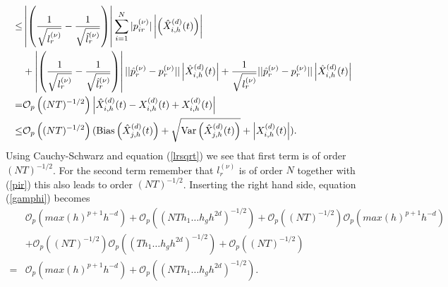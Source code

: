 \begin{equation}
\begin{split}
\leq & \left| \left( \frac{1}{\sqrt{l_r^{(\nu)}}} - \frac{1}{\sqrt{\hat{l}_r^{(\nu)}}} \right)\right| \sum_{i=1}^N  | p^{(\nu)}_{ir}| \left|  \left( \hat{X}^{(d)}_{i,h}(t)  \right)\right|\\
&+ \left| \left( \frac{1}{\sqrt{l_r^{(\nu)}}} - \frac{1}{\sqrt{\hat{l}_r^{(\nu)}}} \right) \right| ||   \hat{p}^{(\nu)}_{r} -p^{(\nu)}_{r}  || \left| \hat{X}^{(d)}_{i,h}(t) \right| +  \frac{1}{\sqrt{l_r^{(\nu)}}}  || \hat{p}^{(\nu)}_{r} - p^{(\nu)}_{r} ||  \left| \hat{X}^{(d)}_{i,h}(t)  \right| \\
=& \mathcal{O}_p\left( (N T)^{-1/2}\right) \left| \hat{X}^{(d)}_{i,h}(t) - X^{(d)}_{i,h}(t) +X^{(d)}_{i,h}(t) \right| \\
\leq & \mathcal{O}_p\left( (N T)^{-1/2}\right)(\operatorname{Bias}\left(\hat{X}^{(d)}_{j,h}(t)\right)+\sqrt{\operatorname{Var}\left(\hat{X}^{(d)}_{j,h}(t)\right)}+\left|X^{(d)}_{i,h}(t)\right| ).
\end{split}
\end{equation}
Using Cauchy-Schwarz and equation (\ref{lrsqrt}) we see that first term is of order $(NT)^{-1/2}$. For the second term remember that $l_r^{(\nu)}$ is of order $N$ together with  (\ref{pir}) this also leads to order $(NT)^{-1/2}$.
Inserting the right hand side, equation (\ref{gamphi}) becomes
\begin{equation}
\begin{split}
&\mathcal{O}_p\left( max(h)^{p+1} h^{-d}\right) +\mathcal{O}_p\left( (N T  h_1\dots h_g  h^{2d} )^{-1/2} \right)+\mathcal{O}_p\left(  (N T)^{-1/2}\right) \mathcal{O}_p\left( max(h)^{p+1} h^{-d}\right)\\
& + \mathcal{O}_p\left(  (N T)^{-1/2}\right)\mathcal{O}_p\left((T h_1\dots h_g  h^{2d})^{-1/2}  \right)+\mathcal{O}_p\left(  (N T)^{-1/2}\right)\\
=&\mathcal{O}_p\left( max(h)^{p+1} h^{-d}\right) +\mathcal{O}_p\left((N T  h_1\dots h_g  h^{2d} )^{-1/2} \right).
\end{split}
\end{equation}



